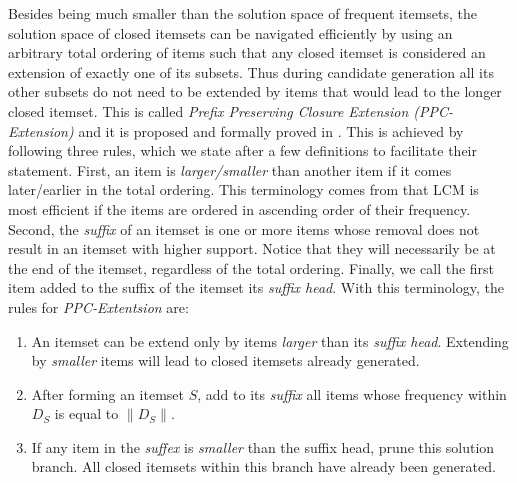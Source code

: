 \documentclass{sig-alternate}
\begin{document}
Besides being much smaller than the solution space of frequent itemsets, the solution space of closed itemsets can be navigated efficiently by using an arbitrary total ordering of items such that any closed itemset is considered an extension of exactly one of its subsets. Thus during candidate generation all its other subsets do not need to be extended by items that would lead to the longer closed itemset.  This is called \emph{Prefix Preserving Closure Extension (PPC-Extension)} and it is proposed and formally proved in \cite{lcm}. This is achieved by following three rules, which we state after a few definitions to facilitate their statement. First, an item is \emph{larger/smaller} than another item if it comes later/earlier in the total ordering. This terminology comes from that LCM is most efficient if the items are ordered in ascending order of their frequency. Second, the \emph{suffix} of an itemset is one or more items whose removal does not result in an itemset with higher support. Notice that they will necessarily be at the end of the itemset, regardless of the total ordering. Finally, we call the first item added to the suffix of the itemset its \emph{suffix head}. With this terminology, the rules for \emph{PPC-Extentsion} are:
\begin{enumerate}
\item An itemset can be extend only by items \emph{larger} than its \emph{suffix head}. Extending by \emph{smaller} items will lead to closed itemsets already generated.
\item After forming an itemset $S$, add to its \emph{suffix} all items whose frequency within $D_S$ is equal to $\|D_S\|$. %
\item If any item in the \emph{suffex} is \emph{smaller} than the suffix head, prune this solution branch. All closed itemsets within this branch have already been generated.
\end{enumerate}
 
\end{document}
